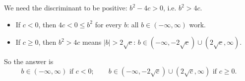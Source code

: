We need the discriminant to be positive: $b^2-4c>0$, i.e. $b^2>4c$.
\begin{itemize}
\item If $c<0$, then $4c<0\le b^2$ for every $b$: all $b\in(-\infty,\infty)$ work.
\item If $c\ge0$, then $b^2>4c$ means $|b|>2\sqrt c$: $b\in\left(-\infty,-2\sqrt c\right)\cup\left(2\sqrt c,\infty\right)$.
\end{itemize}
So the answer is
\[\boxed{b\in(-\infty,\infty)\text{ if }c<0;\qquad b\in\left(-\infty,-2\sqrt c\right)\cup\left(2\sqrt c,\infty\right)\text{ if }c\ge0.}\]
